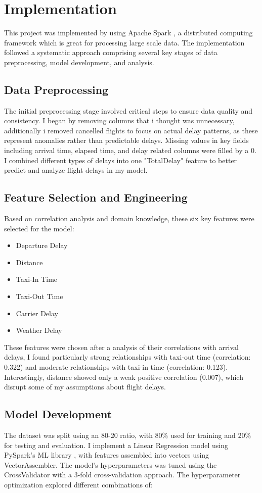 \section{Implementation}
This project was implemented by using Apache Spark \cite{ApacheSpark}, a distributed computing framework which is great for processing large scale data. 
The implementation followed a systematic approach comprising several key stages of data preprocessing, model development, and analysis.

\subsection{Data Preprocessing}
The initial preprocessing stage involved critical steps to ensure data quality and consistency. 
I began by removing columns that i thought was unnecessary, additionally i removed cancelled flights to focus on actual delay patterns, as these represent anomalies rather than predictable delays. 
Missing values in key fields including arrival time, elapsed time, and delay related columns were filled by a 0.
I combined different types of delays into one "TotalDelay" feature to better predict and analyze flight delays in my model.

\subsection{Feature Selection and Engineering}
Based on correlation analysis and domain knowledge, these six key features were selected for the model:

\begin{itemize}
\item Departure Delay
\item Distance
\item Taxi-In Time
\item Taxi-Out Time
\item Carrier Delay
\item Weather Delay
\end{itemize}
These features were chosen after a analysis of their correlations with arrival delays, I found particularly strong relationships with taxi-out time (correlation: 0.322) and moderate relationships with taxi-in time (correlation: 0.123). Interestingly, distance showed only a weak positive correlation (0.007), which disrupt some of my assumptions about flight delays.

\subsection{Model Development}
The dataset was split using an 80-20 ratio, with 80\% used for training and 20\% for testing and evaluation. I implement a Linear Regression \cite{LR} model using PySpark's ML library \cite{SparkMLlib}, with features assembled into vectors using VectorAssembler. 
The model's hyperparameters was tuned using the CrossValidator with a 3-fold cross-validation approach.
The hyperparameter optimization explored different combinations of:

